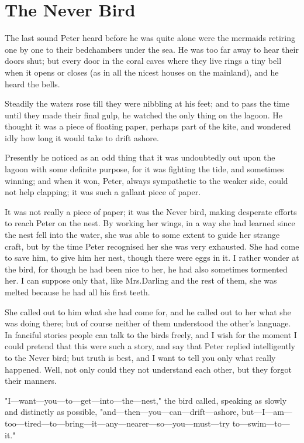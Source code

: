 
\chapter{The Never Bird}

The last sound Peter heard before he was quite alone
were the mermaids retiring one by one to their bedchambers under the sea.
He was too far away to hear their doors shut;
but every door in the coral caves where they live rings a tiny bell when it opens or closes
(as in all the nicest houses on the mainland),
and he heard the bells.

Steadily the waters rose till they were nibbling at his feet;
and to pass the time until they made their final gulp,
he watched the only thing on the lagoon.
He thought it was a piece of floating paper, perhaps part of the kite,
and wondered idly how long it would take to drift ashore.

Presently he noticed as an odd thing that it was undoubtedly out upon the lagoon with some definite purpose,
for it was fighting the tide, and sometimes winning;
and when it won, Peter, always sympathetic to the weaker side, could not help clapping;
it was such a gallant piece of paper.

It was not really a piece of paper;
it was the Never bird, making desperate efforts to reach Peter on the nest.
By working her wings, in a way she had learned since the nest fell into the water,
she was able to some extent to guide her strange craft,
but by the time Peter recognised her she was very exhausted.
She had come to save him, to give him her nest, though there were eggs in it.
I rather wonder at the bird, for though he had been nice to her, he had also sometimes tormented her.
I can suppose only that, like Mrs.\@ Darling and the rest of them, she was melted because he had all his first teeth.

She called out to him what she had come for,
and he called out to her what she was doing there;
but of course neither of them understood the other's language.
In fanciful stories people can talk to the birds freely,
and I wish for the moment I could pretend that this were such a story,
and say that Peter replied intelligently to the Never bird;
but truth is best, and I want to tell you only what really happened.
Well, not only could they not understand each other, but they forgot their manners.

"I—want—you—to—get—into—the—nest," the bird called, speaking as slowly and distinctly as possible,
"and—then—you—can—drift—ashore,
but—I—am—too—tired—to—bring—it—any—nearer—so—you—must—try to—swim—to—it."

